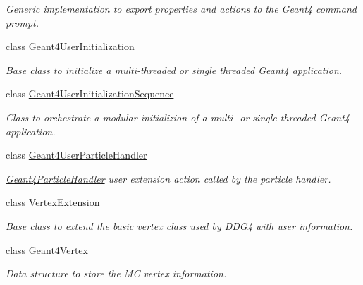 \begin{DoxyCompactItemize}
\begin{DoxyCompactList}\small\item\em Generic implementation to export properties and actions to the Geant4 command prompt. \item\end{DoxyCompactList}\item 
class \hyperlink{class_d_d4hep_1_1_simulation_1_1_geant4_user_initialization}{Geant4UserInitialization}
\begin{DoxyCompactList}\small\item\em Base class to initialize a multi-\/threaded or single threaded Geant4 application. \item\end{DoxyCompactList}\item 
class \hyperlink{class_d_d4hep_1_1_simulation_1_1_geant4_user_initialization_sequence}{Geant4UserInitializationSequence}
\begin{DoxyCompactList}\small\item\em Class to orchestrate a modular initializion of a multi-\/ or single threaded Geant4 application. \item\end{DoxyCompactList}\item 
class \hyperlink{class_d_d4hep_1_1_simulation_1_1_geant4_user_particle_handler}{Geant4UserParticleHandler}
\begin{DoxyCompactList}\small\item\em \hyperlink{class_d_d4hep_1_1_simulation_1_1_geant4_particle_handler}{Geant4ParticleHandler} user extension action called by the particle handler. \item\end{DoxyCompactList}\item 
class \hyperlink{class_d_d4hep_1_1_simulation_1_1_vertex_extension}{VertexExtension}
\begin{DoxyCompactList}\small\item\em Base class to extend the basic vertex class used by DDG4 with user information. \item\end{DoxyCompactList}\item 
class \hyperlink{class_d_d4hep_1_1_simulation_1_1_geant4_vertex}{Geant4Vertex}
\begin{DoxyCompactList}\small\item\em Data structure to store the MC vertex information. \item\end{DoxyCompactList}\item 

\end{DoxyCompactItemize}
